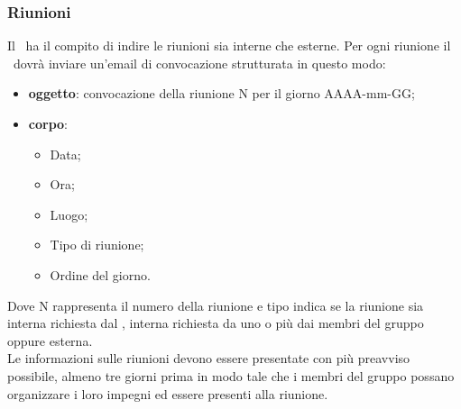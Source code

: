 \documentclass[../NormeProgetto.tex]{subfiles}
\begin{document}
		\subsubsection{Riunioni}
			Il \responsabilediprogetto\ ha il compito di indire le riunioni sia interne che esterne. Per ogni riunione il \responsabilediprogetto\ dovrà inviare un'email di convocazione strutturata in questo modo:
			\begin{itemize}
			\item \textbf{oggetto}: convocazione della riunione N per il giorno AAAA-mm-GG;
			\item \textbf{corpo}: 
			\begin{itemize}
			\item Data;
			\item Ora;
			\item Luogo;
			\item Tipo di riunione;
			\item Ordine del giorno.
			\end{itemize}
			\end{itemize}
			Dove N rappresenta il numero della riunione e tipo indica se la riunione sia interna richiesta dal \responsabilediprogetto, interna richiesta da uno o più dai membri del gruppo oppure esterna. \\
			Le informazioni sulle riunioni devono essere presentate con più preavviso possibile, almeno tre giorni prima in modo tale che i membri del gruppo possano organizzare i loro impegni ed essere presenti alla riunione.
\end{document}
